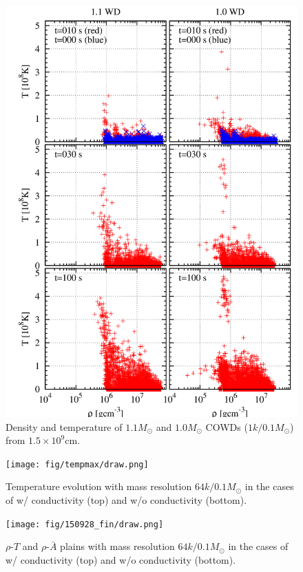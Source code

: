 \documentclass[fleqn,dvipdfmx]{article}
\begin{document}
\begin{figure}
  \begin{center}
    \includegraphics[width=14cm,bb=0 0 880 1240]{fig/bwd.1.5/draw.png}
  \end{center}
  \caption{Density and temperature of $1.1M_\odot$ and $1.0M_\odot$
    COWDs ($1k/0.1M_{\odot}$) from $1.5 \times 10^9$cm.}
\end{figure}

\begin{figure}
  \begin{center}
    \texttt{[image: fig/tempmax/draw.png]}
  \end{center}
  \caption{Temperature evolution with mass resolution
    $64k/0.1M_{\odot}$ in the cases of w/ conductivity (top) and w/o
    conductivity (bottom).}
\end{figure}

\begin{figure}
  \begin{center}
    \texttt{[image: fig/150928\_fin/draw.png]}
  \end{center}
  \caption{$\rho$-$T$ and $\rho$-$\bar{A}$ plains with mass resolution
    $64k/0.1M_{\odot}$ in the cases of w/ conductivity (top) and w/o
    conductivity (bottom).}
\end{figure}
\end{document}
